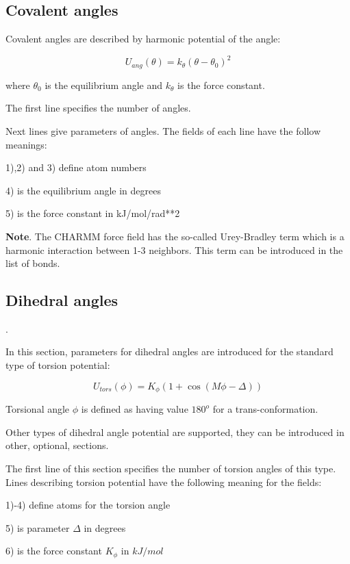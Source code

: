 \documentclass{article}
\begin{document}
\subsection{Covalent angles}

Covalent angles are described by harmonic potential of the angle:

\begin{equation}
\label{harm-ang}
U_{ang}(\theta) = k_{\theta}(\theta - \theta_0)^2
\end{equation}

\noindent
where $\theta_0$ is the equilibrium angle and $k_{\theta}$ is the force 
constant.

The first line specifies the number of angles.

Next lines give parameters of angles. The fields of each line have the 
follow meanings:

1),2) and 3) define atom numbers 

4) is the equilibrium angle in degrees

5) is the force constant in kJ/mol/rad**2

{\bf Note}. The CHARMM force field has the so-called Urey-Bradley term which is
a harmonic interaction between 1-3 neighbors. This term can be introduced 
in the list of bonds.

\subsection{Dihedral angles}. 

In this section, parameters for dihedral angles are introduced for the
standard type of torsion potential: 

\begin{equation}
\label{tors-0}
U_{tors}(\phi) = K_{\phi}(1+\cos(M\phi-\Delta))
\end{equation}

Torsional angle $\phi$ is defined as having value $180^o$ for a
trans-conformation.

Other types of dihedral angle potential are supported, they can be introduced
in other, optional, sections.

The first line of this section specifies the number of torsion angles of
this type. Lines describing torsion potential have the 
following meaning for the fields:

1)-4) define atoms for the torsion angle

5) is parameter $\Delta$ in degrees

6) is the force constant $K_{\phi}$ in $kJ/mol$
\end{document}
